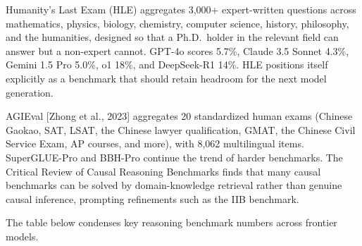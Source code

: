 \documentclass{article}
\begin{document}
Humanity's Last Exam (HLE) \cite{phan20252025} aggregates 3,000+ expert-written questions across mathematics, physics, biology, chemistry, computer science, history, philosophy, and the humanities, designed so that a Ph.D.~holder in the relevant field can answer but a non-expert cannot. GPT-4o scores 5.7\%, Claude 3.5 Sonnet 4.3\%, Gemini 1.5 Pro 5.0\%, o1 18\%, and DeepSeek-R1 14\%. HLE positions itself explicitly as a benchmark that should retain headroom for the next model generation.

AGIEval {[}Zhong et al., 2023{]} aggregates 20 standardized human exams (Chinese Gaokao, SAT, LSAT, the Chinese lawyer qualification, GMAT, the Chinese Civil Service Exam, AP courses, and more), with 8,062 multilingual items. SuperGLUE-Pro and BBH-Pro continue the trend of harder benchmarks. The Critical Review of Causal Reasoning Benchmarks \cite{yang20242024} finds that many causal benchmarks can be solved by domain-knowledge retrieval rather than genuine causal inference, prompting refinements such as the IIB benchmark.

The table below condenses key reasoning benchmark numbers across frontier models.
\end{document}
